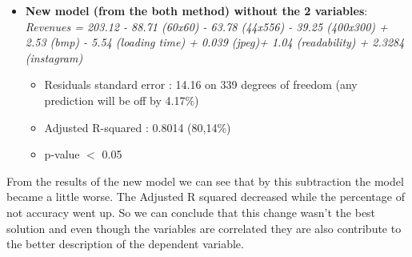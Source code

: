 \documentclass{book}
\begin{document}
\begin{itemize}
\item \textbf{New model (from the both method) without the 2 variables}:\\
\textit{Revenues = 203.12 - 88.71 (60x60) - 63.78 (44x556) - 39.25 (400x300) + 2.53 (bmp) - 5.54 (loading time) + 0.039 (jpeg)+ 1.04 (readability) + 2.3284 (instagram) }
\begin{itemize}
\item Residuals standard error : 14.16 on 339 degrees of freedom (any prediction will be off by 4.17\%)
\item Adjusted R-squared : 0.8014 (80,14\%)
\item p-value $<$ 0.05
\end{itemize}
\end{itemize}
From the results of the new model we can see that by this subtraction the model became a little worse. The Adjusted R squared decreased while the percentage of not accuracy went up. So we can conclude that this change wasn't the best solution and even though the variables are correlated they are also contribute to the better description of the dependent variable. 
\end{document}
